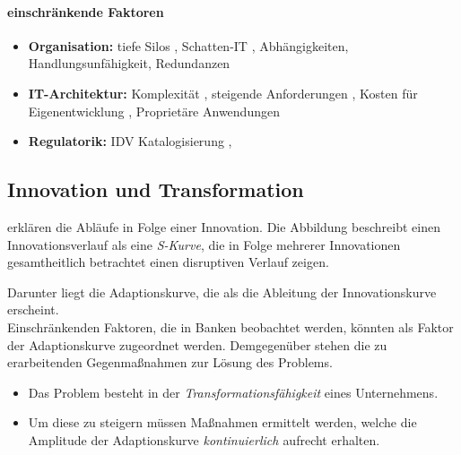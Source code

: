 \paragraph{einschränkende Faktoren}
\begin{itemize}
    \item \textbf{Organisation:} tiefe Silos \cite{Gupta:2017}, Schatten-IT \cite{recht/Bornemann2018}, Abhängigkeiten, Handlungsunfähigkeit, Redundanzen
    \item \textbf{IT-Architektur:} Komplexität \cite{Brockhoff2006}, steigende Anforderungen \cite{Brockhoff2006}, Kosten für Eigenentwicklung \cite{Gupta:2017}, Proprietäre Anwendungen \cite{Bussmann2006}
    \item \textbf{Regulatorik:} \ac{IDV} Katalogisierung
    \cite{recht/Bornemann2018}, 
    
\end{itemize}

\subsection{Innovation und Transformation}
\citet[Kap. 2.2]{Alt2017} erklären die Abläufe in Folge einer Innovation. Die Abbildung \cite[Abb. 2.1]{Alt2017} beschreibt einen Innovationsverlauf als eine \emph{S-Kurve}, die in Folge mehrerer Innovationen gesamtheitlich betrachtet einen disruptiven Verlauf zeigen.

Darunter liegt die Adaptionskurve, die als die Ableitung der Innovationskurve erscheint.
\medskip
\\
Einschränkenden Faktoren, die in Banken beobachtet werden, könnten als Faktor der Adaptionskurve \cite[Abb. 2.1]{Alt2017} zugeordnet werden. Demgegenüber stehen die zu erarbeitenden Gegenmaßnahmen zur Lösung des Problems. 

\begin{itemize}
    \item Das Problem besteht in der \emph{Transformationsfähigkeit} eines Unternehmens. 
    \item Um diese zu steigern müssen Maßnahmen ermittelt werden, welche die Amplitude der Adaptionskurve \cite[Abb. 2.1]{Alt2017} \emph{kontinuierlich \cite{Bussmann2006}} aufrecht erhalten. 
\end{itemize}

